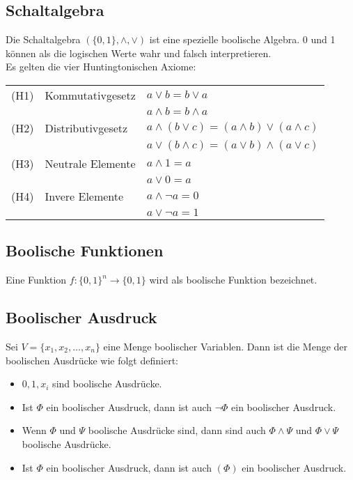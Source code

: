 \documentclass[12pt]{article}
\begin{document}
\subsection{Schaltalgebra}
Die Schaltalgebra $(\{0,1\}, \land, \lor)$ ist eine spezielle boolische Algebra. 0 und 1 können als die logischen Werte wahr und falsch interpretieren. \\
Es gelten die vier Huntingtonischen Axiome: \\
\newline
\begin{tabular}{l l l}
    (H1) & Kommutativgesetz & $a \lor b = b \lor a$ \\
    & & $a \land b = b \land a$ \\
    (H2) & Distributivgesetz & $a \land (b \lor c) = (a \land b) \lor (a \land c)$ \\
    & & $a \lor (b \land c) = (a \lor b) \land (a \lor c)$ \\
    (H3) & Neutrale Elemente & $a \land 1 = a$ \\
    & & $a \lor 0 = a$ \\
    (H4) & Invere Elemente & $a \land \neg a = 0$ \\
    & & $a \lor \neg a = 1$ \\
\end{tabular}
\subsection{Boolische Funktionen}
Eine Funktion $f: \{0,1\}^n \rightarrow \{0,1\}$ wird als boolische Funktion bezeichnet.
\subsection{Boolischer Ausdruck}
Sei $V = \{x_1, x_2, \dots, x_n\}$ eine Menge boolischer Variablen. Dann ist die Menge der boolischen Ausdrücke wie folgt definiert: \\
\begin{itemize}
    \item $0,1,x_i$ sind boolische Ausdrücke.
    \item Ist $\Phi$ ein boolischer Ausdruck, dann ist auch $\neg \Phi$ ein boolischer Ausdruck.
    \item Wenn $\Phi$ und $\Psi$ boolische Ausdrücke sind, dann sind auch $\Phi \land \Psi$ und $\Phi \lor \Psi$ boolische Ausdrücke.
    \item Ist $\Phi$ ein boolischer Ausdruck, dann ist auch $(\Phi)$ ein boolischer Ausdruck.
\end{itemize}
\end{document}
